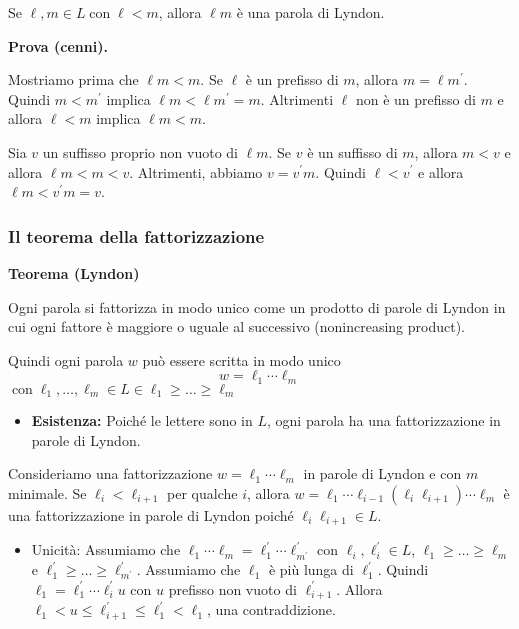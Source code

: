 \vspace{5mm}

Se $\ell, m \in L \operatorname{con} \ell<m$, allora $\ell m$ è una parola di Lyndon.

\vspace{5mm}


\textbf{Prova (cenni).}

Mostriamo prima che $\ell m<m .$ Se $\ell$ è un prefisso di $m$, allora $m=\ell m^{\prime}$. Quindi $m<m^{\prime}$ implica $\ell m<\ell m^{\prime}=m$. Altrimenti $\ell$ non è un prefisso di $m$ e allora $\ell<m$ implica $\ell m<m$.

Sia $v$ un suffisso proprio non vuoto di $\ell m$. Se $v$ è un suffisso di $m$, allora $m<v$ e allora $\ell m<m<v$. Altrimenti, abbiamo $v=v^{\prime} m$. Quindi $\ell<v^{\prime}$ e allora $\ell m<v^{\prime} m=v$.

\subsubsection{Il teorema della fattorizzazione}

\textbf{Teorema (Lyndon)}

Ogni parola si fattorizza in modo unico come un prodotto di parole di Lyndon in cui ogni fattore è maggiore o uguale al successivo (nonincreasing product).

Quindi ogni parola $w$ può essere scritta in modo unico
$$
w=\ell_{1} \cdots \ell_{m}
$$
$\operatorname{con} \ell_{1}, \ldots, \ell_{m} \in L \in \ell_{1} \geq \ldots \geq \ell_{m}$

\vspace{5mm}

\begin{itemize}
    \item \textbf{Esistenza:} Poiché le lettere sono in $L$, ogni parola ha una fattorizzazione in parole di Lyndon.
\end{itemize}

Consideriamo una fattorizzazione $w=\ell_{1} \cdots \ell_{m}$ in parole di Lyndon e con $m$ minimale. Se $\ell_{i}<\ell_{i+1}$ per qualche $i$, allora $w=\ell_{1} \cdots \ell_{i-1}\left(\ell_{i} \ell_{i+1}\right) \cdots \ell_{m}$ è una fattorizzazione in parole di Lyndon poiché $\ell_{i} \ell_{i+1} \in L$.

\begin{itemize}
    \item Unicità: Assumiamo che $\ell_{1} \cdots \ell_{m}=\ell_{1}^{\prime} \cdots \ell_{m^{\prime}}^{\prime}$ con $\ell_{i}, \ell_{i}^{\prime} \in L$, $\ell_{1} \geq \ldots \geq \ell_{m}$ e $\ell_{1}^{\prime} \geq \ldots \geq \ell_{m^{\prime}}^{\prime}$. Assumiamo che $\ell_{1}$ è più lunga di $\ell_{1}^{\prime}$. Quindi $\ell_{1}=\ell_{1}^{\prime} \cdots \ell_{i}^{\prime} u$ con $u$ prefisso non vuoto di $\ell_{i+1}^{\prime}$. Allora $\ell_{1}<u \leq \ell_{i+1}^{\prime} \leq \ell_{1}^{\prime}<\ell_{1}$, una contraddizione.
\end{itemize}

